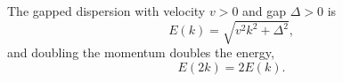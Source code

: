 \documentclass{article}
\begin{document}
The gapped dispersion with velocity $v>0$ and gap $\Delta>0$ is
\begin{equation}
E(k) = \sqrt{v^2k^2+\Delta^2} ,
\label{eq:disp}
\end{equation}
and doubling the momentum doubles the energy,
\begin{equation}
E(2k) = 2E(k) .
\label{eq:double}
\end{equation}
\end{document}
